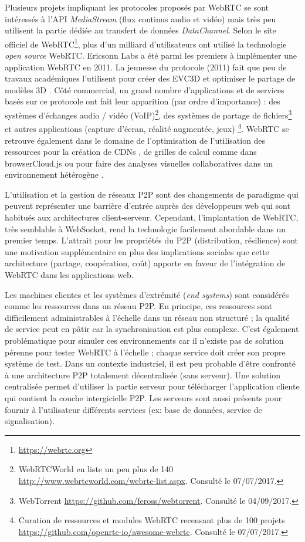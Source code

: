 Plusieurs projets impliquant les protocoles proposés par \gls{WebRTC} 
se sont intéressés à l'\gls{API} \textit{MediaStream} (flux continus audio 
et vidéo) mais très peu utilisent la partie dédiée au transfert de données 
\textit{DataChannel}. 
Selon le site officiel de WebRTC\footnote{\url{https://webrtc.org}}, plus d'un milliard 
d'utilisateurs ont utilisé la technologie \textit{open source} WebRTC. Ericsonn Labs 
a été parmi les premiers à implémenter une application WebRTC en 2011. 
La jeunesse du protocole (2011) fait que peu de travaux académiques 
l'utilisent pour créer des \gls{EVC3D} \cite{Desprat2015a,Steiakaki2016} et 
optimiser le partage de modèles 3D \cite{Koskela2014}. 
Côté commercial, un grand nombre d'applications et de services 
basés sur ce protocole ont fait leur apparition (par ordre d'importance) : 
des systèmes d'échanges audio / vidéo (VoIP)\footnote{WebRTCWorld en 
	liste un peu plus de 140 
	\url{http://www.webrtcworld.com/webrtc-list.aspx}. Consulté le 
	07/07/2017.}, des systèmes de partage de fichiers\footnote{WebTorrent 
	\url{https://github.com/feross/webtorrent}. Consulté le 04/09/2017.} et 
autres applications (capture d'écran, réalité augmentée, jeux)
\footnote{Curation de ressources et modules WebRTC 
	recensant plus de 100 projets 
	\url{https://github.com/openrtc-io/awesome-webrtc}. Consulté le 
	07/07/2017.}. WebRTC se retrouve également dans le domaine de l'optimisation 
	de l'utilisation des ressources pour la création de \glspl{CDN} 
	\cite{Zhang2013b}, de grilles de calcul comme dans
	browserCloud.js \cite{Dias2015a} ou pour faire des analyses visuelles 
	collaboratives dans un environnement hétérogène \cite{Li2015}.


L'utilisation et la gestion de réseaux \gls{P2P} sont des changements de paradigme 
qui peuvent représenter une 
barrière d'entrée auprès des développeurs web qui sont habitués aux architectures 
client-serveur. 
Cependant, l'implantation de WebRTC, très semblable à WebSocket, rend la 
technologie facilement abordable dans un premier temps. L'attrait pour les 
propriétés du \gls{P2P} (distribution, résilience) sont une motivation 
supplémentaire en plus des implications sociales que cette architecture (partage, 
coopération, coût) apporte en faveur de l'intégration de WebRTC dans les 
applications web.

Les machines clientes et les systèmes d'extrémité (\textit{end systems}) 
sont considérés comme \og les ressources\fg{} dans un réseau 
\gls{P2P}. 
En principe, ces ressources sont difficilement administrables à l'échelle 
dans un réseau non structuré ; la qualité de service peut en pâtir car la 
synchronisation est plus complexe. C'est également problématique pour simuler 
ces environnements car il n'existe pas de solution pérenne pour tester WebRTC à 
l'échelle ; chaque service doit créer son propre système de test. 
Dans un contexte industriel, il est peu probable d'être confronté à une architecture 
\gls{P2P} totalement décentralisée (sans serveur). Une solution centralisée permet 
d'utiliser la partie serveur pour télécharger l'application cliente qui contient la 
couche intergicielle \gls{P2P}. 
Les serveurs sont aussi présents pour fournir à l'utilisateur différents services (ex: 
base de données, service de signalisation). 

